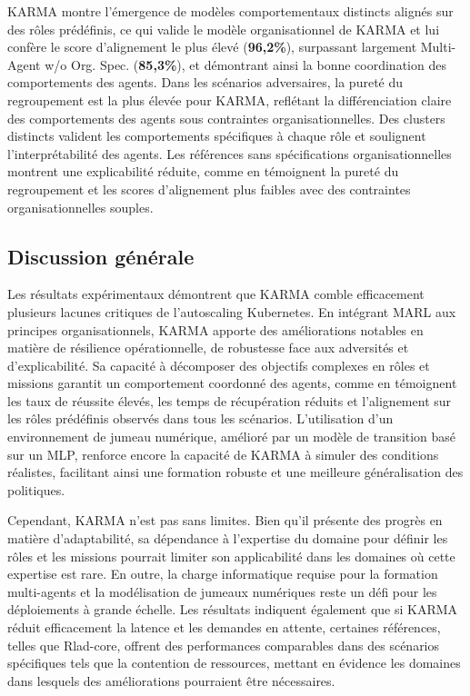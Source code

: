 KARMA montre l'émergence de modèles comportementaux distincts alignés sur des rôles prédéfinis, ce qui valide le modèle organisationnel de KARMA et lui confère le score d'alignement le plus élevé (\textbf{96,2\%}), surpassant largement Multi-Agent w/o Org. Spec. (\textbf{85,3\%}), et démontrant ainsi la bonne coordination des comportements des agents. Dans les scénarios adversaires, la pureté du regroupement est la plus élevée pour KARMA, reflétant la différenciation claire des comportements des agents sous contraintes organisationnelles.
%
Des clusters distincts valident les comportements spécifiques à chaque rôle et soulignent l'interprétabilité des agents. Les références sans spécifications organisationnelles montrent une explicabilité réduite, comme en témoignent la pureté du regroupement et les scores d'alignement plus faibles avec des contraintes organisationnelles souples.

\subsection{Discussion générale}

Les résultats expérimentaux démontrent que KARMA comble efficacement plusieurs lacunes critiques de l'autoscaling Kubernetes. En intégrant MARL aux principes organisationnels, KARMA apporte des améliorations notables en matière de résilience opérationnelle, de robustesse face aux adversités et d'explicabilité. Sa capacité à décomposer des objectifs complexes en rôles et missions garantit un comportement coordonné des agents, comme en témoignent les taux de réussite élevés, les temps de récupération réduits et l'alignement sur les rôles prédéfinis observés dans tous les scénarios. L'utilisation d'un environnement de jumeau numérique, amélioré par un modèle de transition basé sur un MLP, renforce encore la capacité de KARMA à simuler des conditions réalistes, facilitant ainsi une formation robuste et une meilleure généralisation des politiques.

Cependant, KARMA n'est pas sans limites. Bien qu'il présente des progrès en matière d'adaptabilité, sa dépendance à l'expertise du domaine pour définir les rôles et les missions pourrait limiter son applicabilité dans les domaines où cette expertise est rare. En outre, la charge informatique requise pour la formation multi-agents et la modélisation de jumeaux numériques reste un défi pour les déploiements à grande échelle. Les résultats indiquent également que si KARMA réduit efficacement la latence et les demandes en attente, certaines références, telles que Rlad-core, offrent des performances comparables dans des scénarios spécifiques tels que la contention de ressources, mettant en évidence les domaines dans lesquels des améliorations pourraient être nécessaires.


